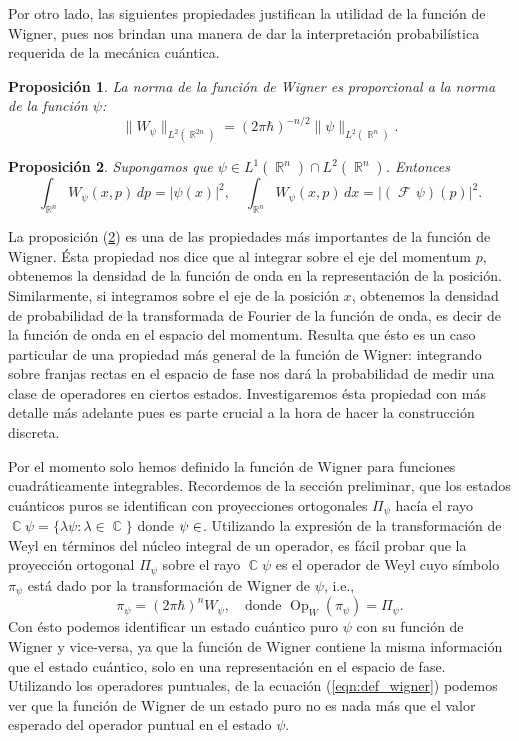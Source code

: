 \documentclass[a4paper,11pt]{report}
\DeclareMathOperator{\R}{\mathbb{R}}
\DeclareMathOperator{\C}{\mathbb{C}}
\let\H\relax
\DeclareMathOperator{\H}{\mathcal H}
\DeclareMathOperator{\Op}{Op}
\DeclareMathOperator{\Fr}{\mathcal{F}\!}
\newtheorem{proposition}{Proposición}
\begin{document}
  Por otro lado, las siguientes propiedades justifican la
  utilidad de la función de Wigner, pues nos brindan una
  manera de dar la interpretación probabilística requerida
  de la mecánica cuántica.
  \begin{proposition}
    \label{prop:wigner_bound}
    La norma de la función de Wigner es proporcional a la
    norma de la función $\psi$:
    \begin{equation}
      \|W_\psi\|_{L^2(\R^{2n})}
      = (2\pi\hbar)^{-n / 2} \|\psi\|_{L^2(\R^{n})}.
    \end{equation}
  \end{proposition}
  \begin{proposition}
    \label{prop:wigner_marginal}
    Supongamos que $\psi \in L^{1}(\R^{n}) \cap
    L^2(\R^{n})$. Entonces
    \begin{equation}
      \int_{\R^{n}} W_\psi(x,p) \, dp
      = |\psi(x)|^2,
      \quad
      \int_{\R^{n}} W_\psi(x,p) \, dx
      = |(\Fr\psi)(p)|^2.
    \end{equation}
  \end{proposition}
  La proposición (\ref{prop:wigner_marginal}) es una de las
  propiedades más importantes de la función de Wigner.
  Ésta propiedad nos dice que al integrar sobre el eje del
  momentum $p$, obtenemos la densidad de la función de onda
  en la representación de la posición. Similarmente, si
  integramos sobre el eje de la posición $x$, obtenemos la
  densidad de probabilidad de la transformada de Fourier de
  la función de onda, es decir de la función de onda en el
  espacio del momentum. Resulta que ésto es un caso
  particular de una propiedad más general de la función de
  Wigner: integrando sobre franjas rectas en el espacio de
  fase nos dará la probabilidad de medir una clase de
  operadores en ciertos estados. Investigaremos ésta
  propiedad con más detalle más adelante pues es parte
  crucial a la hora de hacer la construcción discreta.

  Por el momento solo hemos definido la función de Wigner
  para funciones cuadráticamente integrables. Recordemos de
  la sección preliminar, que los estados cuánticos puros se
  identifican con proyecciones ortogonales $\Pi_\psi$ hacía
  el rayo $\C \psi = \{\lambda \psi : \lambda \in \C\}$
  donde $\psi \in \H$.  Utilizando la expresión de la
  transformación de Weyl en términos del núcleo integral de
  un operador, es fácil probar que la proyección ortogonal
  $\Pi_\psi$ sobre el rayo $\C\psi$ es el operador de Weyl
  cuyo símbolo $\pi_\psi$ está dado por la transformación de
  Wigner de $\psi$, i.e.,
  \begin{equation}
    \pi_\psi = (2\pi\hbar)^{n}W_\psi,
    \quad \text{donde }
    \Op_W(\pi_\psi) = \Pi_\psi.
  \end{equation} 
  Con ésto podemos identificar un estado cuántico puro
  $\psi$ con su función de Wigner y vice-versa, ya que la
  función de Wigner contiene la misma información que el
  estado cuántico, solo en una representación en el espacio
  de fase. Utilizando los operadores puntuales, de la
  ecuación (\ref{eqn:def_wigner}) podemos ver que la función
  de Wigner de un estado puro no es nada más que el valor
  esperado del operador puntual en el estado $\psi$.
\end{document}
